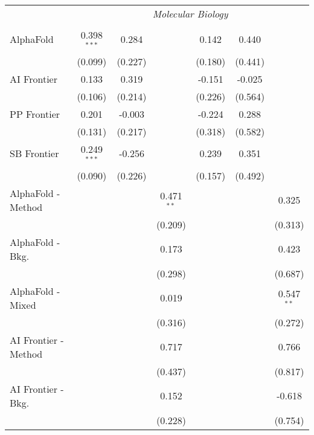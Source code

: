 \begin{tabular}{lcccccc}
 & \multicolumn{6}{c}{\textit{Molecular Biology}} \\ \\
   AlphaFold            & 0.398$^{***}$ & 0.284   &               & 0.142   & 0.440   &   \\   
                        & (0.099)       & (0.227) &               & (0.180) & (0.441) &   \\   
   AI Frontier          & 0.133         & 0.319   &               & -0.151  & -0.025  &   \\   
                        & (0.106)       & (0.214) &               & (0.226) & (0.564) &   \\   
   PP Frontier          & 0.201         & -0.003  &               & -0.224  & 0.288   &   \\   
                        & (0.131)       & (0.217) &               & (0.318) & (0.582) &   \\   
   SB Frontier          & 0.249$^{***}$ & -0.256  &               & 0.239   & 0.351   &   \\   
                        & (0.090)       & (0.226) &               & (0.157) & (0.492) &   \\   
   AlphaFold - Method   &               &         & 0.471$^{**}$  &         &         & 0.325\\   
                        &               &         & (0.209)       &         &         & (0.313)\\   
   AlphaFold - Bkg.     &               &         & 0.173         &         &         & 0.423\\   
                        &               &         & (0.298)       &         &         & (0.687)\\   
   AlphaFold - Mixed    &               &         & 0.019         &         &         & 0.547$^{**}$\\   
                        &               &         & (0.316)       &         &         & (0.272)\\   
   AI Frontier - Method &               &         & 0.717         &         &         & 0.766\\   
                        &               &         & (0.437)       &         &         & (0.817)\\   
   AI Frontier - Bkg.   &               &         & 0.152         &         &         & -0.618\\   
                        &               &         & (0.228)       &         &         & (0.754)\\   

\end{tabular}
